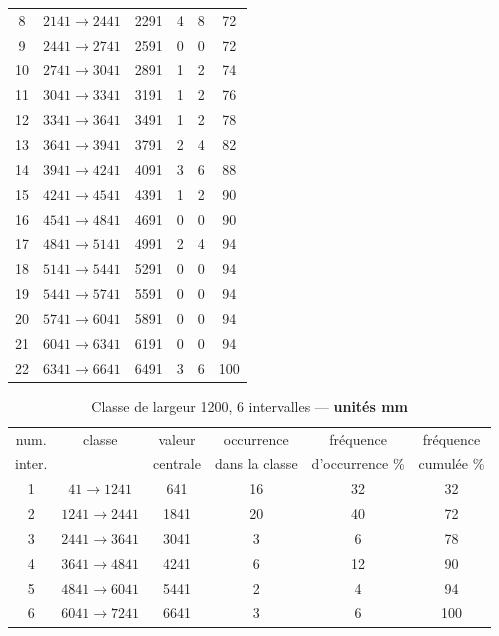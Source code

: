 \begin{enumerate}
\begin{table}
\begin{center}
\begin{tabular}{cccccc}
 8 & $2141 \rightarrow 2441$ & 2291 & 4 &  8 &  72\\
 9 & $2441 \rightarrow 2741$ & 2591 & 0 &  0 &  72\\
10 & $2741 \rightarrow 3041$ & 2891 & 1 &  2 &  74\\
11 & $3041 \rightarrow 3341$ & 3191 & 1 &  2 &  76\\
12 & $3341 \rightarrow 3641$ & 3491 & 1 &  2 &  78\\
13 & $3641 \rightarrow 3941$ & 3791 & 2 &  4 &  82\\
14 & $3941 \rightarrow 4241$ & 4091 & 3 &  6 &  88\\
15 & $4241 \rightarrow 4541$ & 4391 & 1 &  2 &  90\\
16 & $4541 \rightarrow 4841$ & 4691 & 0 &  0 &  90\\
17 & $4841 \rightarrow 5141$ & 4991 & 2 &  4 &  94\\
18 & $5141 \rightarrow 5441$ & 5291 & 0 &  0 &  94\\
19 & $5441 \rightarrow 5741$ & 5591 & 0 &  0 &  94\\
20 & $5741 \rightarrow 6041$ & 5891 & 0 &  0 &  94\\
21 & $6041 \rightarrow 6341$ & 6191 & 0 &  0 &  94\\
22 & $6341 \rightarrow 6641$ & 6491 & 3 &  6 &  100\\
\hline
\end{tabular}
\end{center}
\label{tab:01}
\end{table}
\vspace{1.5cm}

\begin{table}[ht]
\caption{Classe de largeur 1200, 6 intervalles --- \textbf{unités mm}}
\begin{center}
\begin{tabular}{cccccc}
\hline
num. & classe & valeur & occurrence & fréquence & fréquence\\
inter. &  & centrale & dans la classe & d'occurrence \% & cumulée \%\\\hline
 1 & $  41 \rightarrow 1241$ &  641 & 16 & 32 &  32\\
 2 & $1241 \rightarrow 2441$ & 1841 & 20 & 40 &  72\\
 3 & $2441 \rightarrow 3641$ & 3041 &  3 &  6 &  78\\
 4 & $3641 \rightarrow 4841$ & 4241 &  6 & 12 &  90\\
 5 & $4841 \rightarrow 6041$ & 5441 &  2 &  4 &  94\\
 6 & $6041 \rightarrow 7241$ & 6641 &  3 &  6 & 100\\
\hline
\end{tabular}
\end{center}
\label{tab:02}
\end{table}


\end{enumerate}
